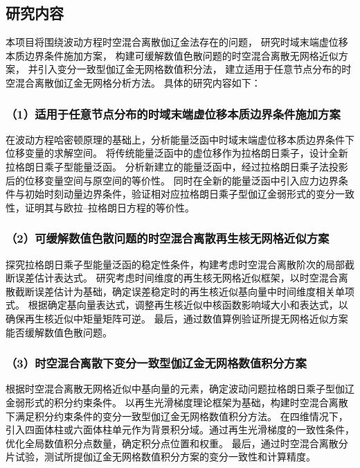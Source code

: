 \vspace{-5pt}
\subsection{研究内容}
本项目将围绕波动方程时空混合离散伽辽金法存在的问题，
研究时域末端虚位移本质边界条件施加方案，
构建可缓解数值色散问题的时空混合离散无网格近似方案，
并引入变分一致型伽辽金无网格数值积分法，
建立适用于任意节点分布的时空混合离散伽辽金无网格分析方法。
具体的研究内容如下：

\subsubsection*{\bfseries （1）适用于任意节点分布的时域末端虚位移本质边界条件施加方案}
在波动方程哈密顿原理的基础上，分析能量泛函中时域末端虚位移本质边界条件下位移变量的求解空间。
将传统能量泛函中的虚位移作为拉格朗日乘子，设计全新拉格朗日乘子型能量泛函。
分析新建立的能量泛函中，经过拉格朗日乘子法投影后的位移变量空间与原空间的等价性。
同时在全新的能量泛函中引入应力边界条件与初始时刻动量边界条件，验证相对应拉格朗日乘子型伽辽金弱形式的变分一致性，证明其与欧拉--拉格朗日方程的等价性。


\subsubsection*{\bfseries （2）可缓解数值色散问题的时空混合离散再生核无网格近似方案}
探究拉格朗日乘子型能量泛函的稳定性条件，构建考虑时空混合离散阶次的局部截断误差估计表达式。
研究考虑时间维度的再生核无网格近似框架，以时空混合离散截断误差估计为基础，确定误差稳定时的再生核近似基向量中时间维度相关单项式。
根据确定基向量表达式，调整再生核近似中核函数影响域大小和表达式，以确保再生核近似中矩量矩阵可逆。
最后，通过数值算例验证所提无网格近似方案能否缓解数值色散问题。

\subsubsection*{\bfseries （3）时空混合离散下变分一致型伽辽金无网格数值积分方案}
根据时空混合离散无网格近似中基向量的元素，确定波动问题拉格朗日乘子型伽辽金弱形式的积分约束条件。
以再生光滑梯度理论框架为基础，构建时空混合离散下满足积分约束条件的变分一致型伽辽金无网格数值积分方法。
在四维情况下，引入四面体柱或六面体柱单元作为背景积分域。通过再生光滑梯度的一致性条件，优化全局数值积分点数量，确定积分点位置和权重。
最后，通过时空混合离散分片试验，测试所提伽辽金无网格数值积分方案的变分一致性和计算精度。

